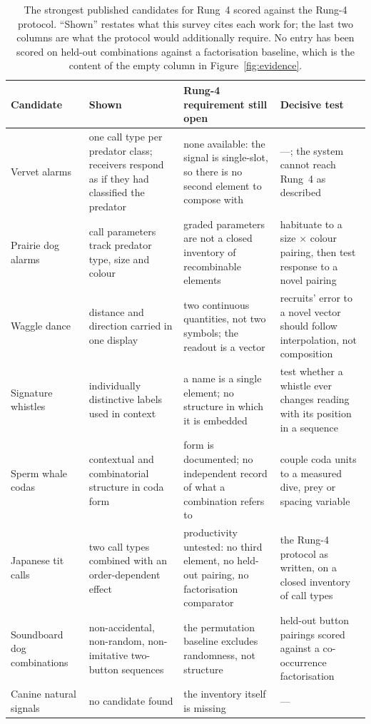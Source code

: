 \begin{table}[htbp]
\centering
\caption{The strongest published candidates for Rung~4 scored against the
Rung-4 protocol. ``Shown'' restates what this survey cites each work for; the
last two columns are what the protocol would additionally require. No entry
has been scored on held-out combinations against a factorisation baseline,
which is the content of the empty column in Figure~\ref{fig:evidence}.}
\label{tab:rung4}
\footnotesize
\setlength{\tabcolsep}{4pt}
\begin{tabular}{@{}>{\raggedright\arraybackslash}p{3.1cm}
  >{\raggedright\arraybackslash}p{3.8cm}
  >{\raggedright\arraybackslash}p{4.0cm}
  >{\raggedright\arraybackslash}p{3.7cm}@{}}
\toprule
\textbf{Candidate} & \textbf{Shown} & \textbf{Rung-4 requirement still open} & \textbf{Decisive test} \\
\midrule
Vervet alarms~\cite{seyfarth1980vervet,cheney1990monkeys} & one call type per predator class; receivers respond as if they had classified the predator & none available: the signal is single-slot, so there is no second element to compose with & ---; the system cannot reach Rung~4 as described \\
Prairie dog alarms~\cite{slobodchikoff2009prairie} & call parameters track predator type, size and colour & graded parameters are not a closed inventory of recombinable elements & habituate to a size $\times$ colour pairing, then test response to a novel pairing \\
Waggle dance~\cite{vonfrisch1967dance} & distance and direction carried in one display & two continuous quantities, not two symbols; the readout is a vector & recruits' error to a novel vector should follow interpolation, not composition \\
Signature whistles~\cite{janik1998whistles,king2013labels} & individually distinctive labels used in context & a name is a single element; no structure in which it is embedded & test whether a whistle ever changes reading with its position in a sequence \\
Sperm whale codas~\cite{sharma2024whale} & contextual and combinatorial structure in coda form & form is documented; no independent record of what a combination refers to & couple coda units to a measured dive, prey or spacing variable \\
Japanese tit calls~\cite{suzuki2016compositional,schlenker2016formal} & two call types combined with an order-dependent effect & productivity untested: no third element, no held-out pairing, no factorisation comparator & the Rung-4 protocol as written, on a closed inventory of call types \\
Soundboard dog combinations~\cite{bastos2024scirep} & non-accidental, non-random, non-imitative two-button sequences & the permutation baseline excludes randomness, not structure & held-out button pairings scored against a co-occurrence factorisation \\
Canine natural signals & no candidate found & the inventory itself is missing & --- \\
\bottomrule
\end{tabular}
\end{table}

